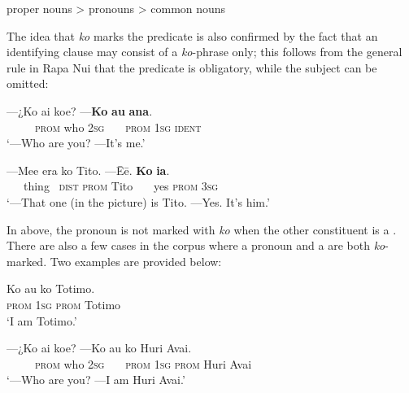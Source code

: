 \ea\label{ex:9.14a}
  proper nouns {\textgreater} pronouns {\textgreater} common nouns
\z

The idea that \textit{ko} marks the predicate is also confirmed by the fact that an identifying clause may consist of a \textit{ko}-phrase only; this follows from the general rule in Rapa Nui that the predicate is obligatory, while the subject can be omitted:

\ea\label{ex:9.15}
\gll —¿Ko ai koe? —\textbf{Ko} \textbf{au} \textbf{{\ꞌ}ana}. \\
~~~~~\textsc{prom} who \textsc{2sg} ~~~\textsc{prom} \textsc{1sg} \textsc{ident} \\

\glt 
‘—Who are you? —It’s me.’ \textstyleExampleref{[Mtx-7-04.071–072]}
\z

\ea\label{ex:9.16}
\gll —Me{\ꞌ}e era ko Tito. —{\ꞌ}Ēē. \textbf{Ko} \textbf{ia}. \\
~~~thing~ \textsc{dist} \textsc{prom} Tito ~~~yes \textsc{prom} \textsc{3sg} \\

\glt 
‘—That one (in the picture) is Tito. —Yes. It’s him.’ \textstyleExampleref{[R414.163–165]}
\z

In  above, the pronoun is not marked with \textit{ko} when the other constituent is a . There are also a few cases in the corpus where a pronoun and a  are both \textit{ko}{}-marked. Two examples are provided below:

\ea\label{ex:9.17}
\gll Ko au ko Totimo. \\
\textsc{prom} \textsc{1sg} \textsc{prom} Totimo \\

\glt 
‘I am Totimo.’ \textstyleExampleref{[R399.193]} 
\z

\ea\label{ex:9.18}
\gll —¿Ko ai koe? —Ko au ko Huri {\ꞌ}Avai. \\
~~~~~\textsc{prom} who \textsc{2sg} ~~~\textsc{prom} \textsc{1sg} \textsc{prom} Huri Avai \\

\glt
‘—Who are you? —I am Huri Avai.’ \textstyleExampleref{[Mtx-3-01.127–128]}
\z

